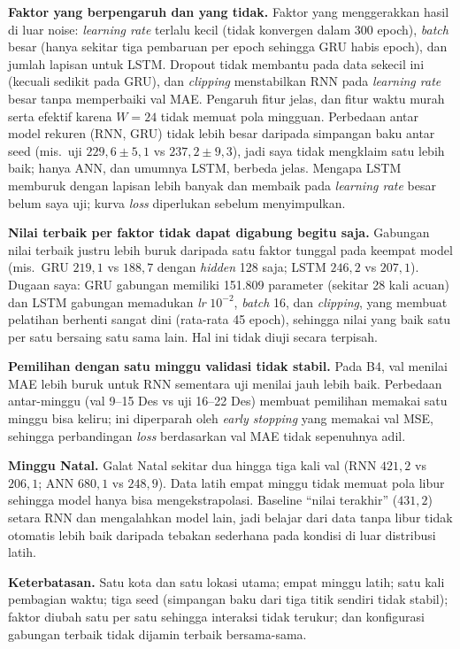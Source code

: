 \documentclass[conference,a4paper]{IEEEtran}
\begin{document}
\textbf{Faktor yang berpengaruh dan yang tidak.} Faktor yang menggerakkan hasil di luar noise: \textit{learning rate} terlalu kecil (tidak konvergen dalam 300 epoch), \textit{batch} besar (hanya sekitar tiga pembaruan per epoch sehingga GRU habis epoch), dan jumlah lapisan untuk LSTM. Dropout tidak membantu pada data sekecil ini (kecuali sedikit pada GRU), dan \textit{clipping} menstabilkan RNN pada \textit{learning rate} besar tanpa memperbaiki val MAE. Pengaruh fitur jelas, dan fitur waktu murah serta efektif karena $W=24$ tidak memuat pola mingguan. Perbedaan antar model rekuren (RNN, GRU) tidak lebih besar daripada simpangan baku antar seed (mis.\ uji $229{,}6 \pm 5{,}1$ vs $237{,}2 \pm 9{,}3$), jadi saya tidak mengklaim satu lebih baik; hanya ANN, dan umumnya LSTM, berbeda jelas. Mengapa LSTM memburuk dengan lapisan lebih banyak dan membaik pada \textit{learning rate} besar belum saya uji; kurva \textit{loss} diperlukan sebelum menyimpulkan.

\textbf{Nilai terbaik per faktor tidak dapat digabung begitu saja.} Gabungan nilai terbaik justru lebih buruk daripada satu faktor tunggal pada keempat model (mis.\ GRU $219{,}1$ vs $188{,}7$ dengan \textit{hidden} 128 saja; LSTM $246{,}2$ vs $207{,}1$). Dugaan saya: GRU gabungan memiliki 151.809 parameter (sekitar 28 kali acuan) dan LSTM gabungan memadukan \textit{lr} $10^{-2}$, \textit{batch} 16, dan \textit{clipping}, yang membuat pelatihan berhenti sangat dini (rata-rata 45 epoch), sehingga nilai yang baik satu per satu bersaing satu sama lain. Hal ini tidak diuji secara terpisah.

\textbf{Pemilihan dengan satu minggu validasi tidak stabil.} Pada B4, val menilai MAE lebih buruk untuk RNN sementara uji menilai jauh lebih baik. Perbedaan antar-minggu (val 9--15 Des vs uji 16--22 Des) membuat pemilihan memakai satu minggu bisa keliru; ini diperparah oleh \textit{early stopping} yang memakai val MSE, sehingga perbandingan \textit{loss} berdasarkan val MAE tidak sepenuhnya adil.

\textbf{Minggu Natal.} Galat Natal sekitar dua hingga tiga kali val (RNN $421{,}2$ vs $206{,}1$; ANN $680{,}1$ vs $248{,}9$). Data latih empat minggu tidak memuat pola libur sehingga model hanya bisa mengekstrapolasi. Baseline ``nilai terakhir'' ($431{,}2$) setara RNN dan mengalahkan model lain, jadi belajar dari data tanpa libur tidak otomatis lebih baik daripada tebakan sederhana pada kondisi di luar distribusi latih.

\textbf{Keterbatasan.} Satu kota dan satu lokasi utama; empat minggu latih; satu kali pembagian waktu; tiga seed (simpangan baku dari tiga titik sendiri tidak stabil); faktor diubah satu per satu sehingga interaksi tidak terukur; dan konfigurasi gabungan terbaik tidak dijamin terbaik bersama-sama.
\end{document}
